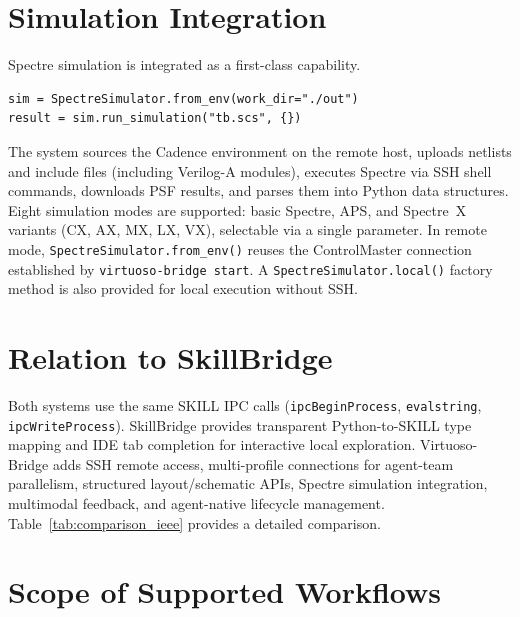 \documentclass[lettersize,journal]{ieee_template/IEEEtran}
\begin{document}
\section{Simulation Integration}

Spectre simulation is integrated as a first-class capability.

\begin{lstlisting}
sim = SpectreSimulator.from_env(work_dir="./out")
result = sim.run_simulation("tb.scs", {})
\end{lstlisting}

The system sources the Cadence environment on the remote host, uploads netlists and include files (including Verilog-A modules), executes Spectre via SSH shell commands, downloads PSF results, and parses them into Python data structures. Eight simulation modes are supported: basic Spectre, APS, and Spectre~X variants (CX, AX, MX, LX, VX), selectable via a single parameter. In remote mode, \texttt{SpectreSimulator.from\_env()} reuses the ControlMaster connection established by \texttt{virtuoso-bridge start}. A \texttt{SpectreSimulator.local()} factory method is also provided for local execution without SSH.

\section{Relation to SkillBridge}

Both systems use the same SKILL IPC calls (\texttt{ipcBeginProcess}, \texttt{evalstring}, \texttt{ipcWriteProcess}). SkillBridge provides transparent Python-to-SKILL type mapping and IDE tab completion for interactive local exploration. Virtuoso-Bridge adds SSH remote access, multi-profile connections for agent-team parallelism, structured layout/schematic APIs, Spectre simulation integration, multimodal feedback, and agent-native lifecycle management. Table~\ref{tab:comparison_ieee} provides a detailed comparison.

\section{Scope of Supported Workflows}
\end{document}
